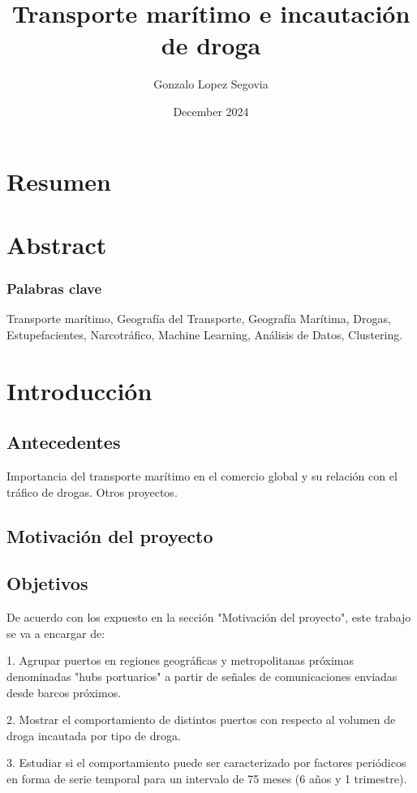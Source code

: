 \documentclass{article}
\title{Transporte marítimo e incautación de droga}
\author{Gonzalo Lopez Segovia}
\date{December 2024}
\begin{document}
\maketitle

\section{Resumen}

\section{Abstract}

	\subsubsection{Palabras clave}
	Transporte marítimo, Geografía del Transporte, Geografía Marítima, Drogas, Estupefacientes, Narcotráfico, Machine Learning, Análisis de Datos, Clustering.

\section{Introducción}

	\subsection{Antecedentes}
	Importancia del transporte marítimo en el comercio global y su relación con el tráfico de drogas.
	Otros proyectos.

	\subsection{Motivación del proyecto}

	\subsection{Objetivos}
	De acuerdo con los expuesto en la sección "Motivación del proyecto", este trabajo se va a encargar de:

	1. Agrupar puertos en regiones geográficas y metropolitanas próximas denominadas "hubs portuarios" a partir de señales de comunicaciones enviadas desde barcos próximos.

	2. Mostrar el comportamiento de distintos puertos con respecto al volumen de droga incautada por tipo de droga.

	3. Estudiar si el comportamiento puede ser caracterizado por factores periódicos en forma de serie temporal para un intervalo de 75 meses (6 años y 1 trimestre).
	
\end{document}
